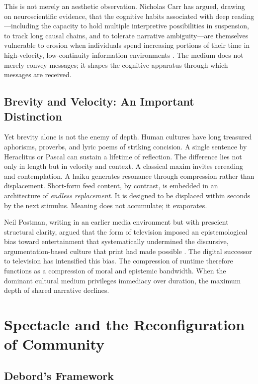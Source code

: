 \documentclass[11pt]{article}
\begin{document}
This is not merely an aesthetic observation. Nicholas Carr has argued, drawing on neuroscientific evidence, that the cognitive habits associated with deep reading---including the capacity to hold multiple interpretive possibilities in suspension, to track long causal chains, and to tolerate narrative ambiguity---are themselves vulnerable to erosion when individuals spend increasing portions of their time in high-velocity, low-continuity information environments \citep{Carr2010}. The medium does not merely convey messages; it shapes the cognitive apparatus through which messages are received.

\subsection{Brevity and Velocity: An Important Distinction}

Yet brevity alone is not the enemy of depth. Human cultures have long treasured aphorisms, proverbs, and lyric poems of striking concision. A single sentence by Heraclitus or Pascal can sustain a lifetime of reflection. The difference lies not only in length but in velocity and context. A classical maxim invites rereading and contemplation. A haiku generates resonance through compression rather than displacement. Short-form feed content, by contrast, is embedded in an architecture of \emph{endless replacement}. It is designed to be displaced within seconds by the next stimulus. Meaning does not accumulate; it evaporates.

Neil Postman, writing in an earlier media environment but with prescient structural clarity, argued that the form of television imposed an epistemological bias toward entertainment that systematically undermined the discursive, argumentation-based culture that print had made possible \citep{Postman1985}. The digital successor to television has intensified this bias. The compression of runtime therefore functions as a compression of moral and epistemic bandwidth. When the dominant cultural medium privileges immediacy over duration, the maximum depth of shared narrative declines.

\section{Spectacle and the Reconfiguration of Community}
\label{sec:spectacle}

\subsection{Debord's Framework}
\end{document}
